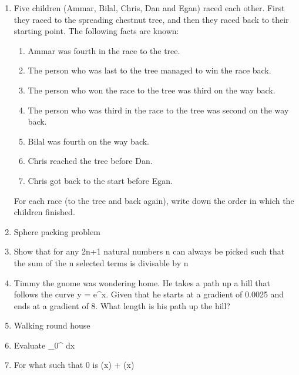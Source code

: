 \documentclass[a4paper]{article}
\begin{document}
\begin{enumerate}
\item
Five children (Ammar, Bilal, Chris, Dan and Egan) raced each other.  First they raced to the spreading chestnut tree, and then they raced back to their starting point. The following facts are known:
\begin{enumerate}
	\item Ammar was fourth in the race to the tree.
	\item The person who was last to the tree managed to win the race back.
	\item The person who won the race to the tree was third on the way back.
	\item The person who was third in the race to the tree was second on the way back.
	\item Bilal was fourth on the way back.
	\item Chris reached the tree before Dan.
	\item Chris got back to the start before Egan.
\end{enumerate}
For  each  race  (to  the  tree  and  back  again),  write  down  the  order  in  which  the  children finished.

\item
Sphere packing problem

\item
Show that for any 2n+1 natural numbers n can always be picked such that the sum of the n selected terms is divisable by n

\item
Timmy the gnome was wondering home. He takes a path up a hill that follows the curve y = e^x. Given that he starts at a gradient of 0.0025 and ends at a gradient of 8. What length is his path up the hill?

\item
Walking round house

\item
Evaluate
\int_{0}^{}  dx

\item
For what \theta such that 0 \leq \theta {}\pi is \sin(x) + \cos(x) 

\end{enumerate}
\end{document}
